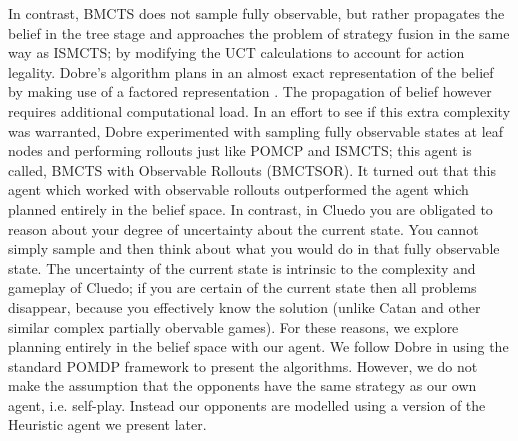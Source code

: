 \documentclass[msc, ai, twoside, notimes, logo, parskip, leftchapter, normalheadings]{infthesis}
\begin{document}
In contrast, BMCTS does not sample fully observable, but rather propagates the belief in the tree stage and approaches the problem of strategy fusion in the same way as ISMCTS; by modifying the UCT calculations to account for action legality. Dobre's algorithm plans in an almost exact representation of the belief by making use of a factored representation \citep{Mihai}. The propagation of belief however requires additional computational load. In an effort to see if this extra complexity was warranted, Dobre experimented with sampling fully observable states at leaf nodes and performing rollouts just like POMCP and ISMCTS; this agent is called, BMCTS with Observable Rollouts (BMCTSOR). It turned out that this agent which worked with observable rollouts outperformed the agent which planned entirely in the belief space. In contrast, in Cluedo you are obligated to reason about your degree of uncertainty about the current state. You cannot simply sample and then think about what you would do in that fully observable state. The uncertainty of the current state is intrinsic to the complexity and gameplay of Cluedo; if you are certain of the current state then all problems disappear, because you effectively know the solution (unlike Catan and other similar complex partially obervable games). For these reasons, we explore planning entirely in the belief space with our agent. We follow Dobre in using the standard POMDP framework to present the algorithms. However, we do not make the assumption that the opponents have the same strategy as our own agent, i.e. self-play. Instead our opponents are modelled using a version of the Heuristic agent we present later.
\end{document}
